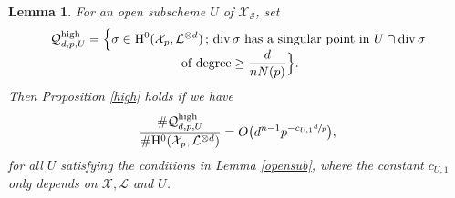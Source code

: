 \documentclass[11pt]{article}
\numberwithin{equation}{section}
\newcommand{\sep}{\,;\,}
\theoremstyle{plain}
\newtheorem{lem}[thm]{Lemma}
\theoremstyle{definition}
\newcommand{\ho}{\mathrm{H}}
\newcommand{\X}{\mathcal{X}}
\newcommand{\li}{\mathcal{L}}
\begin{document}
\begin{lem}\label{opensubworks}
For an open subscheme $U$ of $\X_\mathcal{S}$, set
\begin{multline*}
\mathcal{Q}^{\mathrm{high}}_{d,p,U}=\Bigl\{ \sigma\in \ho^0(\X_{p}, \li^{\otimes d})\sep \div \sigma \text{ has a singular point in } U\cap \div \sigma\\[-5pt] \text{ of degree}\geq \frac{d}{nN(p)}\Bigr\}.
\end{multline*}
Then Proposition \ref{high} holds if we have
\[
\frac{\#\mathcal{Q}_{d,p,U}^{\mathrm{high}}}{\#\ho^0(\X_{p}, \li^{\otimes d})}=O\bigl(d^{n-1}p^{-c_{U,1}\sfrac{d}{p}} \bigr),
\]
for all $U$ satisfying the conditions in Lemma \ref{opensub}, where the constant $c_{U,1}$ only depends on $\X,\li$ and $U$.
\end{lem}
\end{document}
